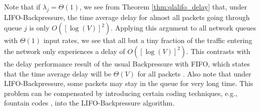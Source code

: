 \documentclass[journal]{IEEEtran}
\newcommand{\bv}[1]{{\boldsymbol{#1} }}
\begin{document}


Note that if $\lambda_j=\Theta(1)$, we see from Theorem \ref{thm:qlalifo_delay} that, under LIFO-Backpressure, the time average delay for almost all packets   going through queue $j$ is only $O([\log(V)]^2)$. Applying this argument to all network queues with $\Theta(1)$ input rates, we see that all but a tiny fraction of the traffic entering the network only experiences a delay of $O([\log(V)]^2)$.  This contrasts with the delay performance result of the usual Backpressure with FIFO, which states that the time average delay will be $\Theta(V)$ for all packets \cite{huangneely_dr_tac}.
Also note that under LIFO-Backpressure, some packets may stay in the queue for very long time. This problem can be compensated by introducing certain coding techniques, e.g., fountain codes \cite{mitzenmacher-fountain}, into the LIFO-Backpressure algorithm. 



\end{document}
